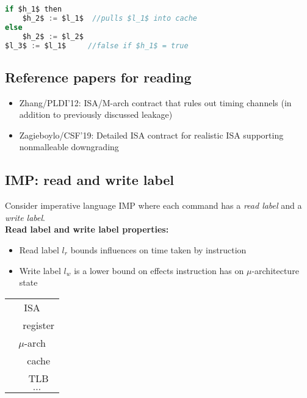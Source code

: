 \documentclass{article}
\begin{document}
\begin{lstlisting}[mathescape,frame=single,basicstyle=\ttfamily,language=java,caption={Timing to update $l_3$ depends on the value of $h_1$.},captionpos=b]
if $h_1$ then
    $h_2$ := $l_1$  //pulls $l_1$ into cache
else 
    $h_2$ := $l_2$
$l_3$ := $l_1$     //false if $h_1$ = true
\end{lstlisting}

\subsection{Reference papers for reading}

\begin{itemize}
	\item{Zhang/PLDI'12: ISA/M-arch contract that rules out timing channels (in addition to previously discussed leakage)}
	\item{Zagieboylo/CSF'19: Detailed ISA contract for realistic ISA supporting nonmalleable downgrading}
\end{itemize}

\subsection{IMP: read and write label}

Consider imperative language IMP where each command has a \emph{read label} and a \emph{write label}. \\

\textbf{Read label and write label properties:}

\begin{itemize}
	\item{Read label $l_r$ bounds influences on time taken by instruction}
	\item{Write label $l_w$ is a lower bound on effects instruction has on $\mu$-architecture state}
\end{itemize}
\begin{tabular}{|c|}

\hline
ISA \\
$\quad$ register \\
\hline
$\mu$-arch \\
$\quad$ cache \\
$\quad$ TLB \\
$\quad \ldots$ \\
\hline
\end{tabular}\\ \\
\end{document}
